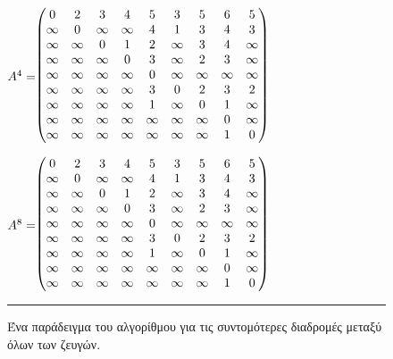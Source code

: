 \documentclass[12pt,a4paper]{article}
\begin{document}
\begin{figure}[H]
\centering
\begin{minipage}{0.46\textwidth}
\centering
\footnotesize
$\vcenter{\hbox{$A^4 = $}}\hspace{-0.07cm} \begin{pmatrix}
0 & 2 & 3 & 4 & 5 & 3 & 5 & 6 & 5 \\
\infty & 0 & \infty & \infty & 4 & 1 & 3 & 4 & 3 \\
\infty & \infty & 0 & 1 & 2 & \infty & 3 & 4 & \infty \\
\infty & \infty & \infty & 0 & 3 & \infty & 2 & 3 & \infty \\
\infty & \infty & \infty & \infty & 0 & \infty & \infty & \infty & \infty \\
\infty & \infty & \infty & \infty & 3 & 0 & 2 & 3 & 2 \\
\infty & \infty & \infty & \infty & 1 & \infty & 0 & 1 & \infty \\
\infty & \infty & \infty & \infty & \infty & \infty & \infty & 0 & \infty \\
\infty & \infty & \infty & \infty & \infty & \infty & \infty & 1 & 0
\end{pmatrix}$
\end{minipage}
\hspace{1cm}
\begin{minipage}{0.46\textwidth}
\centering
\footnotesize
$\vcenter{\hbox{$A^8 = $}}\hspace{-0.07cm} \begin{pmatrix}
0 & 2 & 3 & 4 & 5 & 3 & 5 & 6 & 5 \\
\infty & 0 & \infty & \infty & 4 & 1 & 3 & 4 & 3 \\
\infty & \infty & 0 & 1 & 2 & \infty & 3 & 4  & \infty \\
\infty & \infty & \infty & 0 & 3 & \infty & 2 & 3 & \infty \\
\infty & \infty & \infty & \infty & 0 & \infty & \infty & \infty & \infty \\
\infty & \infty & \infty & \infty & 3 & 0 & 2 & 3 & 2 \\
\infty & \infty & \infty & \infty & 1 & \infty & 0 & 1 & \infty \\
\infty & \infty & \infty & \infty & \infty & \infty & \infty & 0 & \infty \\
\infty & \infty & \infty & \infty & \infty & \infty & \infty & 1 & 0
\end{pmatrix}$
\end{minipage}
\vspace{0.3cm}
\noindent\rule{\textwidth}{0.2pt}
\caption{Ένα παράδειγμα του αλγορίθμου για τις συντομότερες διαδρομές μεταξύ όλων των ζευγών.}
\label{fig:graph7}
\end{figure}
\end{document}
